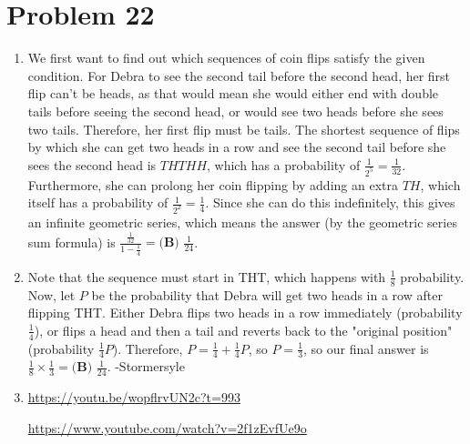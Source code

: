 \documentclass{article}%
\begin{document}
\section*{Problem 22}%
\label{sec:Problem22}%
\begin{enumerate}%
\item%
We first want to find out which sequences of coin flips satisfy the given condition. For Debra to see the second tail before the second head, her first flip can't be heads, as that would mean she would either end with double tails before seeing the second head, or would see two heads before she sees two tails. Therefore, her first flip must be tails. The shortest sequence of flips by which she can get two heads in a row and see the second tail before she sees the second head is $THTHH$, which has a probability of $\frac{1}{2^5} = \frac{1}{32}$. Furthermore, she can prolong her coin flipping by adding an extra $TH$, which itself has a probability of $\frac{1}{2^2} = \frac{1}{4}$. Since she can do this indefinitely, this gives an infinite geometric series, which means the answer (by the geometric series sum formula) is $\frac{\frac{1}{32}}{1-\frac{1}{4}} = \boxed{\textbf{(B) }\frac{1}{24}}$.

%
\item%
Note that the sequence must start in THT, which happens with $\frac{1}{8}$ probability. Now, let $P$ be the probability that Debra will get two heads in a row after flipping THT. Either Debra flips two heads in a row immediately (probability $\frac{1}{4}$), or flips a head and then a tail and reverts back to the "original position" (probability $\frac{1}{4}P$). Therefore, $P=\frac{1}{4}+\frac{1}{4}P$, so $P=\frac{1}{3}$, so our final answer is $\frac{1}{8}\times\frac{1}{3}=\boxed{\textbf{(B) }\frac{1}{24}}$.   -Stormersyle

%
\item%
\href{https://youtu.be/wopflrvUN2c?t=993}{https://youtu.be/wopflrvUN2c?t=993}

\href{https://www.youtube.com/watch?v=2f1zEvfUe9o}{https://www.youtube.com/watch?v=2f1zEvfUe9o}

%
\end{enumerate}

%
\end{document}
